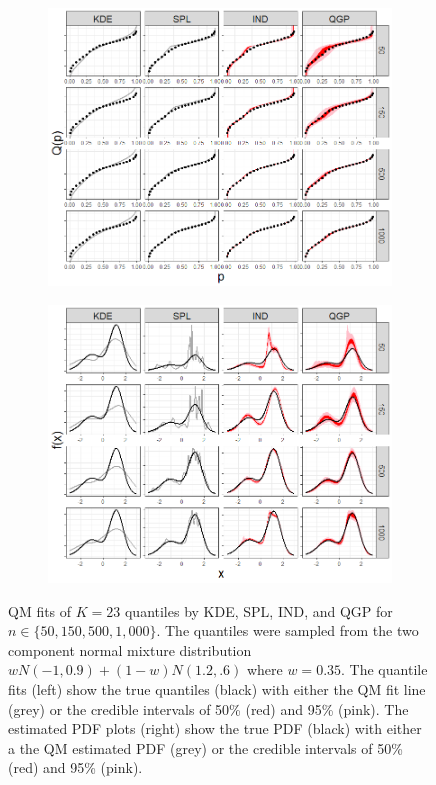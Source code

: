 \documentclass[preprint,12pt,authoryear]{elsarticle}
\begin{document}
\begin{figure}
\centering
\begin{subfigure}{.5\textwidth}
  \centering
  \includegraphics[width=.95\linewidth]{Images/quants_gmix.png}
\end{subfigure}%
\begin{subfigure}{.5\textwidth}
  \centering
  \includegraphics[width=.95\linewidth]{Images/dens_gmix.png}
\end{subfigure}
\caption{QM fits of $K=23$ quantiles by KDE, SPL, IND, and QGP for $n \in \{50, 150, 500, 1{,}000\}$. The quantiles were sampled from the two component normal mixture distribution $w N(-1, 0.9) + (1-w)N(1.2, .6)$ where $w = 0.35$. The quantile fits (left) show the true quantiles (black) with either the QM fit line (grey) or the credible intervals of 50\% (red) and 95\% (pink). 
The estimated PDF plots (right) show the true PDF (black) with either a the QM estimated PDF (grey) or the credible intervals of 50\% (red) and 95\% (pink). }
\label{fig:gmix_fits}
\end{figure}
\end{document}

